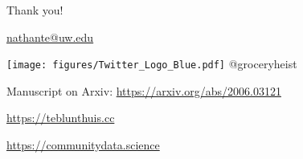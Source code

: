 \documentclass[10pt,xcolor=dvipsnames,aspectratio=169]{beamer}\usepackage[]{graphicx}\usepackage[]{color}
\begin{document}
\begin{frame}

  Thank you!

  \href{mailto:nathante@uw.edu}{nathante@uw.edu}

  \texttt{[image: figures/Twitter\_Logo\_Blue.pdf]} @groceryheist

  Manuscript on Arxiv:  \url{https://arxiv.org/abs/2006.03121}

  \url{https://teblunthuis.cc}

  \url{https://communitydata.science}

\end{frame}

\appendix
\end{document}
